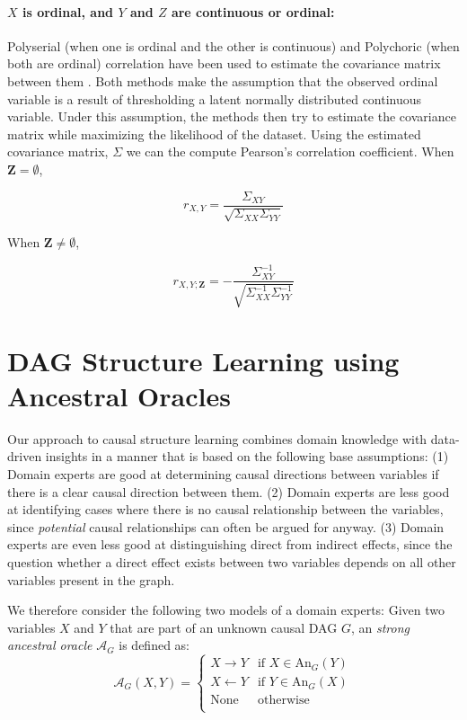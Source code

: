 \documentclass{uai2025} %
\begin{document}
\paragraph{$ X $ is ordinal, and $ Y $ and $ Z $  are continuous or ordinal: }

Polyserial (when one is ordinal and the other is continuous) and Polychoric
(when both are ordinal) correlation have been used to estimate the covariance
matrix between them \citep{Poon1987}. Both methods make the assumption that the
observed ordinal variable is a result of thresholding a latent normally
distributed continuous variable. Under this assumption, the methods then try to
estimate the covariance matrix while maximizing the likelihood of the dataset.
Using the estimated covariance matrix, $ \Sigma $ we can the compute Pearson's
correlation coefficient. When $ \bm{Z} = \emptyset $,

\begin{equation}
	r_{X, Y} = \frac{\Sigma_{XY}}{\sqrt{\Sigma_{XX} \Sigma_{YY}}}
\end{equation}

When $ \bm{Z} \neq \emptyset $, 

\begin{equation}
	r_{X, Y; \bm{Z}} = - \frac{\Sigma^{-1}_{XY}}{\sqrt{\Sigma^{-1}_{XX} \Sigma^{-1}_{YY}}}
\end{equation}


\section{DAG Structure Learning using Ancestral Oracles}
\label{sec:modification}

Our approach to causal structure learning combines domain knowledge with data-driven
insights in a manner that is based on the following base assumptions: 
(1) Domain experts are good at determining causal directions between variables if 
there is a clear causal direction between them. (2) Domain experts are less good
at identifying cases where there is no causal relationship between the variables,
since \emph{potential} causal relationships can often be argued for anyway.
(3) Domain experts are even less good at distinguishing direct from indirect 
effects, since the question whether a direct effect exists between two variables
depends on all other variables present in the graph. 

We therefore consider the following two models of a domain experts: Given two variables
$ X $ and $ Y $ that are part of an unknown causal DAG $G$, an \emph{strong ancestral oracle} 
$\mathcal{A}_G$ is defined as:
$$\mathcal{A}_G(X,Y)=\begin{cases}
 X \to Y & \textrm{if } X \in \textrm{An}_G(Y) \\
 X \gets Y & \textrm{if } Y \in \textrm{An}_G(X) \\
 \textrm{None} & \textrm{otherwise} \\
\end{cases}$$
\end{document}
